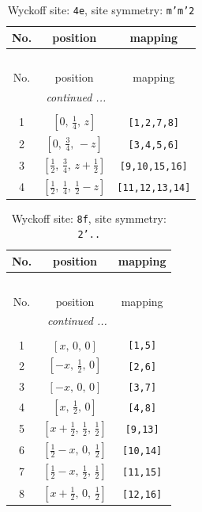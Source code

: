 \documentclass[fleqn,8pt]{jsarticle}
\begin{document}
\renewcommand{\arraystretch}{1.2}
\begin{longtable}{ccc}
\caption{Wyckoff site: {\tt 4e}, site symmetry: {\tt m'm'2}}
 \\
 \hline \hline
No. & position & mapping \\ \hline \endfirsthead

\multicolumn{2}{l}{\tablename\ \thetable{}} \\
 \hline \hline
No. & position & mapping \\ \hline \endhead

 \hline \hline
\multicolumn{2}{r}{\footnotesize\it continued ...} \\ \endfoot

 \hline \hline
\multicolumn{2}{r}{} \\ \endlastfoot

1 & $\left[ 0,\, \frac{1}{4},\, z \right]$ & {\tt [1,2,7,8]} \\ \hline
2 & $\left[ 0,\, \frac{3}{4},\, - z \right]$ & {\tt [3,4,5,6]} \\ \hline
3 & $\left[ \frac{1}{2},\, \frac{3}{4},\, z + \frac{1}{2} \right]$ & {\tt [9,10,15,16]} \\ \hline
4 & $\left[ \frac{1}{2},\, \frac{1}{4},\, \frac{1}{2} - z \right]$ & {\tt [11,12,13,14]} \\
\end{longtable}
\renewcommand{\arraystretch}{1.2}
\begin{longtable}{ccc}
\caption{Wyckoff site: {\tt 8f}, site symmetry: {\tt 2'..}}
 \\
 \hline \hline
No. & position & mapping \\ \hline \endfirsthead

\multicolumn{2}{l}{\tablename\ \thetable{}} \\
 \hline \hline
No. & position & mapping \\ \hline \endhead

 \hline \hline
\multicolumn{2}{r}{\footnotesize\it continued ...} \\ \endfoot

 \hline \hline
\multicolumn{2}{r}{} \\ \endlastfoot

1 & $\left[ x,\, 0,\, 0 \right]$ & {\tt [1,5]} \\ \hline
2 & $\left[ - x,\, \frac{1}{2},\, 0 \right]$ & {\tt [2,6]} \\ \hline
3 & $\left[ - x,\, 0,\, 0 \right]$ & {\tt [3,7]} \\ \hline
4 & $\left[ x,\, \frac{1}{2},\, 0 \right]$ & {\tt [4,8]} \\ \hline
5 & $\left[ x + \frac{1}{2},\, \frac{1}{2},\, \frac{1}{2} \right]$ & {\tt [9,13]} \\ \hline
6 & $\left[ \frac{1}{2} - x,\, 0,\, \frac{1}{2} \right]$ & {\tt [10,14]} \\ \hline
7 & $\left[ \frac{1}{2} - x,\, \frac{1}{2},\, \frac{1}{2} \right]$ & {\tt [11,15]} \\ \hline
8 & $\left[ x + \frac{1}{2},\, 0,\, \frac{1}{2} \right]$ & {\tt [12,16]} \\
\end{longtable}
\end{document}
